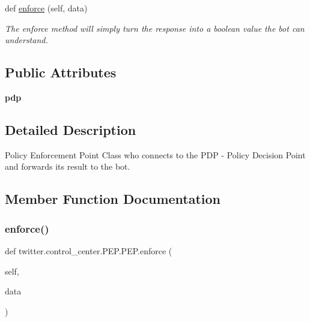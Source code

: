 \begin{DoxyCompactItemize}
def \hyperlink{classtwitter_1_1control__center_1_1PEP_1_1PEP_ad3d661b529e2bd004eda5e3746dab298}{enforce} (self, data)
\begin{DoxyCompactList}\small\item\em The enforce method will simply turn the response into a boolean value the bot can understand. \end{DoxyCompactList}\end{DoxyCompactItemize}
\subsection*{Public Attributes}
\begin{DoxyCompactItemize}
\item 
\mbox{\label{classtwitter_1_1control__center_1_1PEP_1_1PEP_a240eab8688830086e20637c393743af7}} 
{\bfseries pdp}
\end{DoxyCompactItemize}


\subsection{Detailed Description}
Policy Enforcement Point Class who connects to the P\+DP -\/ Policy Decision Point and forwards its result to the bot. 

\subsection{Member Function Documentation}
\mbox{\label{classtwitter_1_1control__center_1_1PEP_1_1PEP_ad3d661b529e2bd004eda5e3746dab298}} 
\subsubsection{\texorpdfstring{enforce()}{enforce()}}
{\footnotesize\ttfamily def twitter.\+control\+\_\+center.\+P\+E\+P.\+P\+E\+P.\+enforce (\begin{DoxyParamCaption}\item[{}]{self,  }\item[{}]{data }\end{DoxyParamCaption})}




